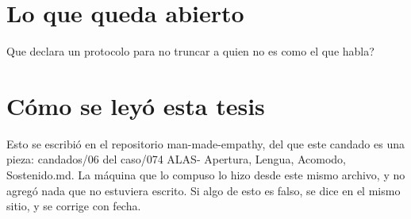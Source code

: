 \documentclass[11pt,a4paper]{article}
\begin{document}
\section{Lo que queda abierto}
\textquestiondown{}Que declara un protocolo para no truncar a quien no es como el que habla?

\section*{Cómo se leyó esta tesis}
Esto se escribió en el repositorio man-made-empathy, del que este candado es una pieza: candados/06 del caso/074 ALAS- Apertura, Lengua, Acomodo, Sostenido.md. La máquina que lo compuso lo hizo desde este mismo archivo, y no agregó nada que no estuviera escrito. Si algo de esto es falso, se dice en el mismo sitio, y se corrige con fecha.
\end{document}
